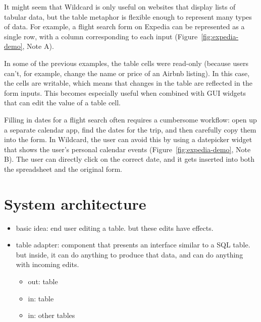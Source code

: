 \documentclass[sigplan,10pt,anonymous,review]{acmart}
\providecommand{\tightlist}{%
  \setlength{\itemsep}{0pt}\setlength{\parskip}{0pt}}
\begin{document}
It might seem that Wildcard is only useful on websites that display
lists of tabular data, but the table metaphor is flexible enough to
represent many types of data. For example, a flight search form on
Expedia can be represented as a single row, with a column corresponding
to each input{ (Figure~\ref{fig:expedia-demo}, Note A)}.

In some of the previous examples, the table cells were read-only
(because users can't, for example, change the name or price of an Airbnb
listing). In this case, the cells are writable, which means that changes
in the table are reflected in the form inputs. This becomes especially
useful when combined with GUI widgets that can edit the value of a table
cell.

Filling in dates for a flight search often requires a cumbersome
workflow: open up a separate calendar app, find the dates for the trip,
and then carefully copy them into the form. In Wildcard, the user can
avoid this by using a datepicker widget that shows the user's personal
calendar events{ (Figure~\ref{fig:expedia-demo}, Note B)}. The user can
directly click on the correct date, and it gets inserted into both the
spreadsheet and the original form.

\hypertarget{sec:architecture}{%
\section{System architecture}\label{sec:architecture}}

\begin{itemize}
\tightlist
\item
  basic idea: end user editing a table. but these edits have effects.
\item
  table adapter: component that presents an interface similar to a SQL
  table. but inside, it can do anything to produce that data, and can do
  anything with incoming edits.

  \begin{itemize}
  \tightlist
  \item
    out: table
  \item
    in: table
  \item
    in: other tables
  \end{itemize}
\end{itemize}
\end{document}
